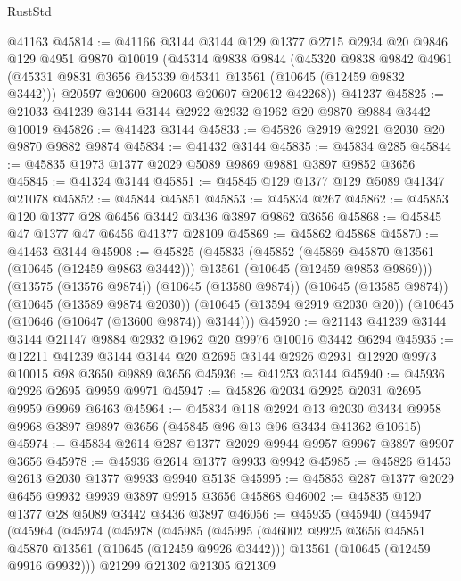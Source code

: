 \begin{lexlean}{RustStd}
\begin{coremodule}
    @41163
@45814 := @41166
    @3144
    @3144
    @129
    @1377
    @2715
    @2934
    @20
    @9846
    @129
    @4951
    @9870
    @10019
    (@45314
      @9838
      @9844
      (@45320
        @9838
        @9842
        @4961
        (@45331 @9831 @3656 @45339 @45341 @13561 (@10645 (@12459 @9832 @3442)))
        @20597
        @20600
        @20603
        @20607
        @20612
        @42268))
    @41237
@45825 := @21033 @41239 @3144 @3144 @2922 @2932 @1962 @20 @9870 @9884 @3442 @10019
@45826 := @41423 @3144
@45833 := @45826 @2919 @2921 @2030 @20 @9870 @9882 @9874
@45834 := @41432 @3144
@45835 := @45834 @285
@45844 := @45835 @1973 @1377 @2029 @5089 @9869 @9881 @3897 @9852 @3656
@45845 := @41324 @3144
@45851 := @45845 @129 @1377 @129 @5089 @41347 @21078
@45852 := @45844 @45851
@45853 := @45834 @267
@45862 := @45853 @120 @1377 @28 @6456 @3442 @3436 @3897 @9862 @3656
@45868 := @45845 @47 @1377 @47 @6456 @41377 @28109
@45869 := @45862 @45868
@45870 := @41463 @3144
@45908 := @45825
    (@45833
      (@45852
        (@45869 @45870 @13561 (@10645 (@12459 @9863 @3442)))
        @13561
        (@10645 (@12459 @9853 @9869)))
      (@13575 (@13576 @9874))
      (@10645 (@13580 @9874))
      (@10645 (@13585 @9874))
      (@10645 (@13589 @9874 @2030))
      (@10645 (@13594 @2919 @2030 @20))
      (@10645 (@10646 (@10647 (@13600 @9874)) @3144)))
@45920 := @21143 @41239 @3144 @3144 @21147 @9884 @2932 @1962 @20 @9976 @10016 @3442 @6294
@45935 := @12211
    @41239
    @3144
    @3144
    @20
    @2695
    @3144
    @2926
    @2931
    @12920
    @9973
    @10015
    @98
    @3650
    @9889
    @3656
@45936 := @41253 @3144
@45940 := @45936 @2926 @2695 @9959 @9971
@45947 := @45826 @2034 @2925 @2031 @2695 @9959 @9969 @6463
@45964 := @45834
    @118
    @2924
    @13
    @2030
    @3434
    @9958
    @9968
    @3897
    @9897
    @3656
    (@45845 @96 @13 @96 @3434 @41362 @10615)
@45974 := @45834 @2614 @287 @1377 @2029 @9944 @9957 @9967 @3897 @9907 @3656
@45978 := @45936 @2614 @1377 @9933 @9942
@45985 := @45826 @1453 @2613 @2030 @1377 @9933 @9940 @5138
@45995 := @45853 @287 @1377 @2029 @6456 @9932 @9939 @3897 @9915 @3656 @45868
@46002 := @45835 @120 @1377 @28 @5089 @3442 @3436 @3897
@46056 := @45935
    (@45940
      (@45947
        (@45964
          (@45974
            (@45978
              (@45985
                (@45995
                  (@46002 @9925 @3656 @45851 @45870 @13561 (@10645 (@12459 @9926 @3442)))
                  @13561
                  (@10645 (@12459 @9916 @9932)))
                @21299
                @21302
                @21305
                @21309

\end{coremodule}
\end{lexlean}
